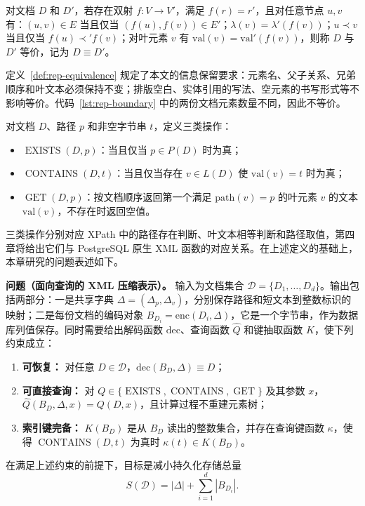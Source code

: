 \begin{definition}[文档等价]
\label{def:rep-equivalence}
对文档 $D$ 和 $D'$，若存在双射 $f:V\to V'$，满足 $f(r)=r'$，且对任意节点 $u,v$ 有：$(u,v)\in E$ 当且仅当 $(f(u),f(v))\in E'$；$\lambda(v)=\lambda'(f(v))$；$u\prec v$ 当且仅当 $f(u)\prec' f(v)$；对叶元素 $v$ 有 $\mathrm{val}(v)=\mathrm{val}'(f(v))$，则称 $D$ 与 $D'$ 等价，记为 $D\equiv D'$。
\end{definition}

定义~\ref{def:rep-equivalence} 规定了本文的信息保留要求：元素名、父子关系、兄弟顺序和叶文本必须保持不变；排版空白、实体引用的写法、空元素的书写形式等不影响等价。代码~\ref{lst:rep-boundary} 中的两份文档元素数量不同，因此不等价。

\begin{definition}[目标查询]
\label{def:rep-queries}
对文档 $D$、路径 $p$ 和非空字节串 $t$，定义三类操作：
\begin{itemize}
\item $\operatorname{EXISTS}(D,p)$：当且仅当 $p\in P(D)$ 时为真；
\item $\operatorname{CONTAINS}(D,t)$：当且仅当存在 $v\in L(D)$ 使 $\mathrm{val}(v)=t$ 时为真；
\item $\operatorname{GET}(D,p)$：按文档顺序返回第一个满足 $\mathrm{path}(v)=p$ 的叶元素 $v$ 的文本 $\mathrm{val}(v)$，不存在时返回空值。
\end{itemize}
\end{definition}

三类操作分别对应 XPath 中的路径存在判断、叶文本相等判断和路径取值，第四章将给出它们与 PostgreSQL 原生 XML 函数的对应关系。在上述定义的基础上，本章研究的问题表述如下。

\textbf{问题（面向查询的 XML 压缩表示）。} 输入为文档集合 $\mathcal{D}=\{D_1,\ldots,D_d\}$。输出包括两部分：一是共享字典 $\Delta=(\Delta_p,\Delta_v)$，分别保存路径和短文本到整数标识的映射；二是每份文档的编码对象 $B_{D_i}=\mathrm{enc}(D_i,\Delta)$，它是一个字节串，作为数据库列值保存。同时需要给出解码函数 $\mathrm{dec}$、查询函数 $\hat Q$ 和键抽取函数 $K$，使下列约束成立：
\begin{enumerate}[label=（C\arabic*）]
\item \textbf{可恢复：} 对任意 $D\in\mathcal{D}$，$\mathrm{dec}(B_D,\Delta)\equiv D$；
\item \textbf{可直接查询：} 对 $Q\in\{\operatorname{EXISTS},\operatorname{CONTAINS},\operatorname{GET}\}$ 及其参数 $x$，$\hat Q(B_D,\Delta,x)=Q(D,x)$，且计算过程不重建元素树；
\item \textbf{索引键完备：} $K(B_D)$ 是从 $B_D$ 读出的整数集合，并存在查询键函数 $\kappa$，使得 $\operatorname{CONTAINS}(D,t)$ 为真时 $\kappa(t)\in K(B_D)$。
\end{enumerate}
在满足上述约束的前提下，目标是减小持久化存储总量
\begin{equation}
S(\mathcal{D})=|\Delta|+\sum_{i=1}^{d}|B_{D_i}|.
\label{eq:rep-objective}
\end{equation}


